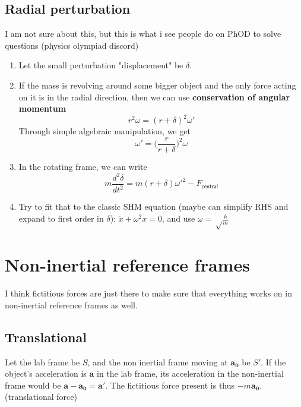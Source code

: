 \documentclass[12pt,a4paper]{extreport}
\numberwithin{equation}{chapter}
\renewcommand{\vec}[1]{\mathbf{#1}}
\begin{document}
        \subsection{Radial perturbation}
        I am not sure about this, but this is what i see people do on PhOD to solve questions (physics olympiad discord)
        \begin{enumerate}
            \item Let the small perturbation "displacement" be $\delta$.
            \item If the mass is revolving around some bigger object and the only force acting on it is in the radial direction, then we can use \textbf{conservation of angular momentum} 
                \begin{equation}
                    r^2\omega=(r+\delta)^2\omega'
                \end{equation}
            Through simple algebraic manipulation, we get
                \begin{equation}
                    \omega'= \bigg(\frac{r}{r+\delta}\bigg)^2\omega
                \end{equation}
            \item In the rotating frame, we can write
            \begin{equation}
                m \frac{d^2 \delta}{dt^2}= m (r+\delta)\omega'^2-F_{\textsf{central}}
            \end{equation}
                 \item Try to fit that to the classic SHM equation (maybe can simplify RHS and expand to first order in $\delta$): $\ddot{x}+\omega^2 x = 0$, and use $\omega = \sqrt \frac{k}{m}$
        \end{enumerate}
    
    \section{Non-inertial reference frames}
    I think fictitious forces are just there to make sure that everything works on in non-inertial reference frames as well. 
        \subsection{Translational}
        Let the lab frame be $S$, and the non inertial frame moving at $\vec{a_0}$ be $S'$. If the object's acceleration is $\vec{a}$ in the lab frame, its acceleration in the non-inertial frame would be $\vec{a}-\vec{a_0}=\vec{a'}$. The fictitious force present is thus $-m \vec{a_0}$. (translational force)
        
\end{document}
